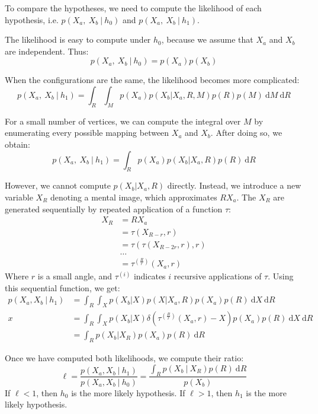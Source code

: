 \documentclass{article} %
\begin{document}
To compare the hypotheses, we need to compute the likelihood of each
hypothesis, i.e. $p(X_a,\ X_b\ \vert \ h_0)$ and $p(X_a,\ X_b\ \vert \
h_1)$.

The likelihood is easy to compute under $h_0$, because we assume that
$X_a$ and $X_b$ are independent. Thus:
\begin{equation}
  p(X_a,\ X_b\ \vert \ h_0)=p(X_a)p(X_b)
  \label{eq:lh-h0}
\end{equation}

When the configurations are the same, the likelihood becomes more
complicated:
\begin{equation} 
  p(X_a,\ X_b\ \vert \ h_1)=\int_R\int_M p(X_a) p(X_b\vert X_a,R,M) p(R) p(M)\ \mathrm{d}M\ \mathrm{d}R
\end{equation}

For a small number of vertices, we can compute the integral over $M$
by enumerating every possible mapping between $X_a$ and $X_b$. After
doing so, we obtain:
\begin{equation} 
  p(X_a,\ X_b\ \vert \ h_1)=\int_R p(X_a) p(X_b\vert X_a,R) p(R)\ \mathrm{d}R
\end{equation}

However, we cannot compute $p(X_b\vert X_a, R)$ directly. Instead, we
introduce a new variable $X_R$ denoting a mental image, which
approximates $RX_a$. The $X_R$ are generated sequentially by repeated
application of a function $\tau$:
\begin{align}
  X_R&=RX_a\nonumber \\
  &=\tau(X_{R-r}, r)\nonumber \\
  &=\tau(\tau(X_{R-2r}, r), r)\nonumber \\
  &\ldots{}\nonumber \\
  &=\tau^{(\frac{R}{r})}(X_a, r)
  \label{eq:tau}
\end{align} 
Where $r$ is a small angle, and $\tau^{(i)}$ indicates $i$ recursive
applications of $\tau$. Using this sequential function, we get:
\begin{align}
  p(X_a, X_b\ \vert \ h_1)&=\int_R \int_{X} p(X_b\vert X) p(X\vert X_a, R)p(X_a)p(R)\ \mathrm{d}X\ \mathrm{d}R \nonumber \\
  x&= \int_R \int_X p(X_b\vert X)\delta(\tau^{(\frac{R}{r})}(X_a, r)-X)p(X_a)p(R)\ \mathrm{d}X\ \mathrm{d}R \nonumber \\
  &= \int_R p(X_b\vert X_R)p(X_a)p(R)\ \mathrm{d}R
  \label{eq:lh-h1}
\end{align}

Once we have computed both likelihoods, we compute their ratio:
\begin{equation}
  \ell=\frac{p(X_a, X_b\ \vert \ h_1)}{p(X_a, X_b\ \vert \ h_0)}=\frac{\int_R p(X_b\ \vert\ X_R)p(R)\ \mathrm{d}R}{p(X_b)}
  \label{eq:lh-ratio}
\end{equation}
If $\ell<1$, then $h_0$ is the more likely hypothesis. If $\ell>1$,
then $h_1$ is the more likely hypothesis.
\end{document}
